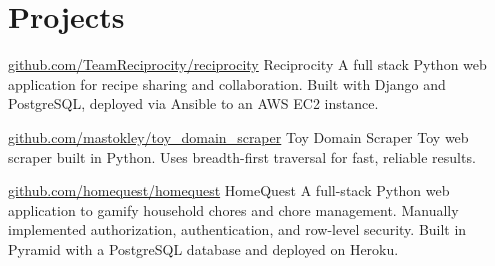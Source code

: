 \documentclass[10pt,a4paper,sans]{moderncv}        %
\begin{document}
\begin{comment}

\cventry {2012.04 - 2015.04} {Cleanscapes} {AR Specialist} {} {Seattle, WA} {
  \begin{itemize}
  \item Wrote and maintained a library of accurate, sophisticated SQL queries to capture evolving data inconsistencies; these queries eliminated 37.5 labor hours per month despite at 126\% increase in customer accounts over a two year period
  \item Designed database reports for internal and external customers, such as government officials and senior management
  \item Delegated data entry and data revision tasks
  \item Collaborated with operations, data quality, payment processing, and customer service teams to analyze and improve processes as new city contracts were won
  \end{itemize}}

\end{comment}

\section{Projects}

\begin{comment}

  \cventry
  {date}
  {github url}
  {name}
  {}
  {}
  {description}

\end{comment}

 {\href{http://github.com/TeamReciprocity/reciprocity}{github.com/TeamReciprocity/reciprocity}} {Reciprocity} {} {} {A full stack Python web application for recipe sharing and collaboration. Built with Django and PostgreSQL, deployed via Ansible to an AWS EC2 instance.}

 {\href{https://github.com/mastokley/toy_domain_scraper}{github.com/mastokley/toy\_domain\_scraper}} {Toy Domain Scraper} {} {} {Toy web scraper built in Python. Uses breadth-first traversal for fast, reliable results.}

 {\href{https://github.com/homequest/homequest}{github.com/homequest/homequest}} {HomeQuest} {} {} {A full-stack Python web application to gamify household chores and chore management. Manually implemented authorization, authentication, and row-level security. Built in Pyramid with a PostgreSQL database and deployed on Heroku.}
\end{document}
